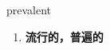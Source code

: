 
\begin{frame}
{\huge prevalent}
\begin{center}
\begin{enumerate}\Large
  \item \textbf{流行的，普遍的}
\end{enumerate}
\end{center}
\end{frame}
